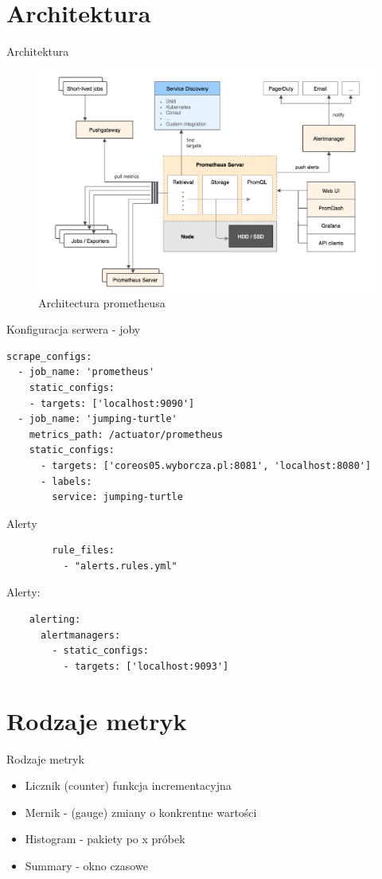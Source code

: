 \documentclass[epic,eepic,aspectratio=169,12pt]{beamer}
\begin{document}
\section{Architektura}
\begin{frame}{Architektura}
		\begin{figure}
			\centering
			\includegraphics[width=0.55\linewidth]{architecture}
			\caption{Architectura prometheusa}
			\label{fig:architecture}
		\end{figure}
\end{frame}
\begin{frame}[fragile]{Konfiguracja serwera - joby}
	\begin{verbatim}
scrape_configs:		
  - job_name: 'prometheus'
    static_configs:
    - targets: ['localhost:9090']		
  - job_name: 'jumping-turtle'
    metrics_path: /actuator/prometheus
    static_configs:
      - targets: ['coreos05.wyborcza.pl:8081', 'localhost:8080']
	  - labels:
        service: jumping-turtle
	\end{verbatim}
\end{frame}
\begin{frame}[fragile]{Alerty}
	\begin{verbatim}
		rule_files:
		  - "alerts.rules.yml"		  
	\end{verbatim}
	Alerty:
	\begin{verbatim}
	alerting:
	  alertmanagers:
	    - static_configs:
	      - targets: ['localhost:9093']
	\end{verbatim}
\end{frame}
\section{Rodzaje metryk}
\begin{frame}{Rodzaje metryk}
	\begin{itemize}
		\item Licznik (counter) funkcja incrementacyjna
		\item Mernik - (gauge) zmiany o konkrentne wartości
		\item Histogram - pakiety po x próbek
		\item Summary - okno czasowe
	\end{itemize}
\end{frame}
\end{document}
